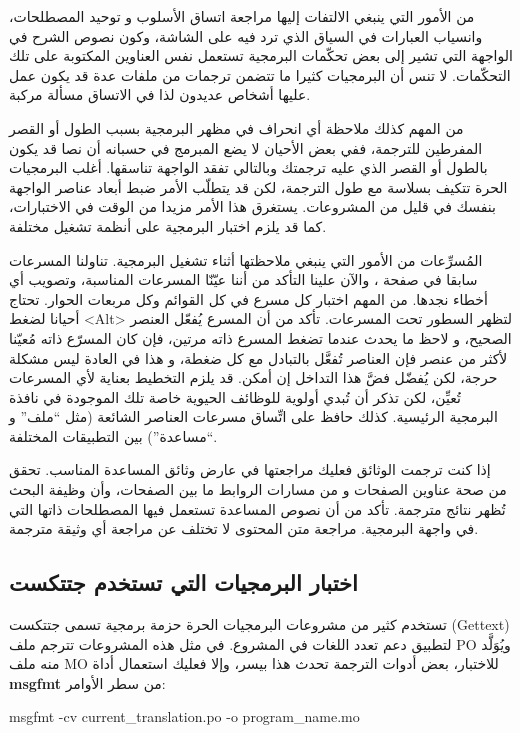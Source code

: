 من الأمور التي ينبغي الالتفات إليها مراجعة اتساق الأسلوب و توحيد
المصطلحات، وانسياب العبارات في السياق الذي ترد فيه على الشاشة، وكون
نصوص الشرح في الواجهة التي تشير إلى بعض تحكّمات البرمجية تستعمل نفس
العناوين المكتوبة على تلك التحكّمات. لا تنس أن البرمجيات كثيرا ما تتضمن
ترجمات من ملفات عدة قد يكون عمل عليها أشخاص عديدون لذا في الاتساق مسألة
مركبة.

من المهم كذلك ملاحظة أي انحراف في مظهر البرمجية بسبب الطول أو القصر
المفرطين للترجمة، ففي بعض الأحيان لا يضع المبرمج في حسبانه أن نصا قد
يكون بالطول أو القصر الذي عليه ترجمتك وبالتالي تفقد الواجهة تناسقها.
أغلب البرمجيات الحرة تتكيف بسلاسة مع طول الترجمة، لكن قد يتطلّب الأمر
ضبط أبعاد عناصر الواجهة بنفسك في قليل من المشروعات. يستغرق هذا الأمر
مزيدا من الوقت في الاختبارات، كما قد يلزم اختبار البرمجية على أنظمة
تشغيل مختلفة.

المُسرِّعات من الأمور التي ينبغي ملاحظتها أثناء تشغيل البرمجية. تناولنا
المسرعات سابقا في صفحة \at[ref:34484726]، والآن علينا التأكد
من أننا عيّنّا المسرعات المناسبة، وتصويب أي أخطاء نجدها. من المهم
اختبار كل مسرع في كل القوائم وكل مربعات الحوار. تحتاج أحيانا لضغط <Alt>
لتظهر السطور تحت المسرعات. تأكد من أن المسرع يُفعّل العنصر الصحيح، و
لاحظ ما يحدث عندما تضغط المسرع ذاته مرتين، فإن كان المسرّع ذاته مُعيّنا
لأكثر من عنصر فإن العناصر تُفعَّل بالتبادل مع كل ضغطة، و هذا في العادة
ليس مشكلة حرجة، لكن يُفضّل فضَّ هذا التداخل إن أمكن. قد يلزم التخطيط
بعناية لأي المسرعات تُعيِّن، لكن تذكر أن تُبدي أولوية للوظائف الحيوية
خاصة تلك الموجودة في نافذة البرمجية الرئيسية. كذلك حافظ على اتِّساق
مسرعات العناصر الشائعة (مثل “ملف” و “مساعدة”) بين التطبيقات المختلفة.

إذا كنت ترجمت الوثائق فعليك مراجعتها في عارض وثائق المساعدة المناسب.
تحقق من صحة عناوين الصفحات و من مسارات الروابط ما بين الصفحات، وأن
وظيفة البحث تُظهر نتائج مترجمة. تأكد من أن نصوص المساعدة تستعمل فيها
المصطلحات ذاتها التي في واجهة البرمجية. مراجعة متن المحتوى لا تختلف عن
مراجعة أي وثيقة مترجمة.

\subsection{اختبار البرمجيات التي تستخدم جتتكست}
تستخدم كثير من مشروعات البرمجيات الحرة حزمة برمجية تسمى جتتكست (Gettext)
لتطبيق دعم تعدد اللغات في المشروع. في مثل هذه المشروعات تترجم ملف PO
ويُوَلَّد منه ملف MO للاختبار، بعض أدوات الترجمة تحدث هذا بيسر، وإلا
فعليك استعمال أداة {\bf msgfmt} من سطر الأوامر:

msgfmt  -cv  current\_translation.po  -o program\_name.mo

